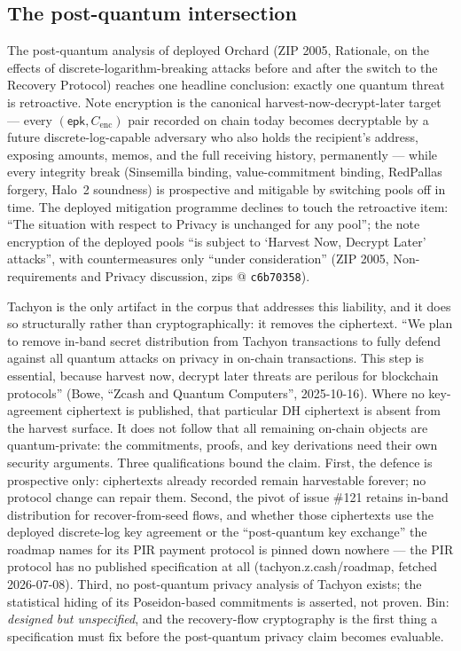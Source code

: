 \documentclass[11pt,a4paper]{article}
\theoremstyle{definition}
\begin{document}
\subsection{The post-quantum intersection}
\label{sec:tachyon-pq-intersection}

The post-quantum analysis of deployed Orchard (ZIP 2005, Rationale, on the
effects of discrete-logarithm-breaking attacks before and after the switch to
the Recovery Protocol) reaches one headline
conclusion: exactly one quantum
threat is retroactive. Note encryption is the canonical
harvest-now-decrypt-later target --- every
$(\mathsf{epk}, C_{\mathrm{enc}})$ pair recorded on chain today becomes
decryptable by a future discrete-log-capable adversary who also holds the
recipient's address, exposing amounts, memos, and the full receiving
history, permanently --- while every integrity break (Sinsemilla binding,
value-commitment binding, RedPallas forgery, Halo~2 soundness) is
prospective and mitigable by switching pools off in time. The deployed
mitigation programme declines to touch the retroactive item: ``The
situation with respect to Privacy is unchanged for any pool''; the note
encryption of the deployed pools ``is subject to `Harvest Now, Decrypt
Later' attacks'', with countermeasures only ``under consideration'' (ZIP
2005, Non-requirements and Privacy discussion, zips @ \texttt{c6b70358}).

Tachyon is the only artifact in the corpus that addresses this liability,
and it does so structurally rather than cryptographically: it removes the
ciphertext. ``We plan to remove in-band secret distribution from Tachyon
transactions to fully defend against all quantum attacks on privacy in
on-chain transactions. This step is essential, because harvest now, decrypt
later threats are perilous for blockchain protocols'' (Bowe, ``Zcash and
Quantum Computers'', 2025-10-16). Where no key-agreement ciphertext is
published, that particular DH ciphertext is absent from the harvest
surface. It does not follow that all remaining on-chain objects are
quantum-private: the commitments, proofs, and key derivations need their
own security arguments. Three qualifications
bound the claim. First, the defence is prospective only: ciphertexts
already recorded remain harvestable forever; no protocol change can repair
them. Second, the pivot of issue \#121 retains in-band distribution for
recover-from-seed flows, and whether those ciphertexts use the deployed
discrete-log key agreement or the ``post-quantum key exchange'' the roadmap
names for its PIR payment protocol is pinned down nowhere --- the PIR
protocol has no published specification at all (tachyon.z.cash/roadmap,
fetched 2026-07-08). Third, no post-quantum privacy analysis of Tachyon
exists; the statistical hiding of its Poseidon-based commitments is
asserted, not proven. Bin: \emph{designed but unspecified}, and the
recovery-flow cryptography is the first thing a specification must fix
before the post-quantum privacy claim becomes evaluable.
\end{document}
